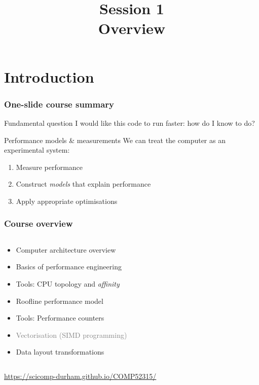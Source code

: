 \documentclass[dvipsnames,presentation,aspectratio=169,14pt]{beamer}
\begin{document}
\title{\scshape\firasemibold\color{White}%
  {\fontsize{20}{0}\selectfont Session 1\\
    \fontsize{40}{40}\selectfont Overview\par}}
\titleslide

\section{Introduction}

\begin{frame}
  \frametitle{One-slide course summary}

  \begin{challenge}{Fundamental question}
    I would like this code to run faster: how do I know  to do?
  \end{challenge}
  \pause
  \begin{answer}{Performance models \& measurements}
    We can treat the computer as an experimental system:
    \begin{enumerate}
    \item Measure performance

    \item Construct \emph{models} that explain performance

    \item Apply appropriate optimisations
    \end{enumerate}
  \end{answer}
\end{frame}

\begin{frame}
  \frametitle{Course overview}
  \begin{columns}
    \begin{column}{0.6\linewidth}
      \begin{itemize}[itemsep=5pt]
      \item Computer architecture overview
      \item Basics of performance engineering
      \item Tools: CPU topology and \emph{affinity}
      \item Roofline performance model
      \item Tools: Performance counters
      \item \textcolor{gray}{Vectorisation (SIMD programming)}
      \item Data layout transformations
      \end{itemize}
    \end{column}
    \hfill
    \begin{column}{0.3\linewidth}
      \centering
      {\color{palette2}%
      }
      \newline
    \end{column}
  \end{columns}
  \centering
  \vskip 20pt

  \url{https://scicomp-durham.github.io/COMP52315/}
\end{frame}
\end{document}
